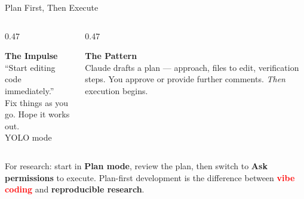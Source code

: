\documentclass[aspectratio=169, 11pt]{beamer}
\newcommand{\emphgold}[1]{\alert{\textbf{#1}}}
\newcommand{\emphcoral}[1]{\textcolor{red}{\textbf{#1}}}
\newcommand{\emphsage}[1]{\textcolor{green!60!black}{\textbf{#1}}}
\begin{document}
\begin{frame}{Plan First, Then Execute}
\begin{columns}[T]
\begin{column}{0.47\textwidth}
  \begin{tcolorbox}[
    enhanced, colback=red!5, colframe=red!30, boxrule=0.5pt,
    sharp corners, left=8pt, right=8pt, top=5pt, bottom=5pt,
  ]
    {\normalsize\bfseries\color{coral} The Impulse}\\[4pt]
    {\small ``Start editing code immediately.''}\\[3pt]
    {\small Fix things as you go. Hope it works out.}\\[3pt]
    {\small\color{slate} YOLO mode}
  \end{tcolorbox}
\end{column}
\begin{column}{0.47\textwidth}
  \begin{tcolorbox}[
    enhanced, colback=green!5, colframe=green!30!black, boxrule=0.5pt,
    sharp corners, left=8pt, right=8pt, top=5pt, bottom=5pt,
  ]
    {\normalsize\bfseries\color{sage} The Pattern}\\[4pt]
    {\small Claude drafts a plan --- approach, files to edit, verification steps. You approve or provide further comments. \emph{Then} execution begins.}
  \end{tcolorbox}
\end{column}
\end{columns}

\vspace{0.1cm}
\begin{keyinsight}
  {\small For research: start in \emphsage{Plan mode}, review the plan, then switch to \emphgold{Ask permissions} to execute. Plan-first development is the difference between \emphcoral{vibe coding} and \emphsage{reproducible research}.}
\end{keyinsight}
\end{frame}
\end{document}
